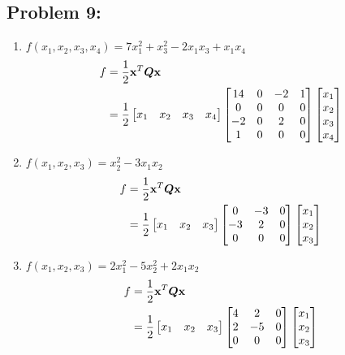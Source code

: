 \documentclass{article}
\begin{document}
\hypertarget{}{}
\subsection*{{Problem 9: }}
\label{}
\begin{enumerate}
\item 
$f(x_1, x_2,x_3, x_4) = 7x_1^2+x_3^2-2x_1x_3+x_1x_4$ \\
\begin{align*} 
f &=\frac{1}{2}\boldsymbol{\mathrm{x}}^T\boldsymbol{Q}\boldsymbol{\mathrm{x}} \\
& =\frac{1}{2} \begin{bmatrix} x_1 &  x_2 & x_3 & x_4  \end{bmatrix} \begin{bmatrix}  14 & 0 & -2 & 1 \\ 0 & 0 & 0 & 0 \\ -2 & 0 & 2 & 0 \\ 1 & 0 & 0 & 0   \end{bmatrix} \begin{bmatrix} x_1 \\  x_2 \\  x_3 \\ x_4 \end{bmatrix}
\end{align*}
\item 
$f(x_1, x_2,x_3) = x_2^2-3x_1x_2$\\
\begin{align*} 
f &=\frac{1}{2}\boldsymbol{\mathrm{x}}^T\boldsymbol{Q}\boldsymbol{\mathrm{x}} \\
& =\frac{1}{2} \begin{bmatrix} x_1 &  x_2 & x_3  \end{bmatrix} \begin{bmatrix}  0 & -3 & 0 \\ -3 & 2 & 0 \\ 0 & 0 & 0   \end{bmatrix} \begin{bmatrix} x_1 \\  x_2 \\  x_3  \end{bmatrix}
\end{align*}
\item 
$f(x_1, x_2,x_3) = 2x_1^2-5x_2^2 +2x_1x_2 $
\begin{align*} 
f &=\frac{1}{2}\boldsymbol{\mathrm{x}}^T\boldsymbol{Q}\boldsymbol{\mathrm{x}} \\
& =\frac{1}{2} \begin{bmatrix} x_1 &  x_2 & x_3  \end{bmatrix} \begin{bmatrix}  4 & 2 & 0 \\ 2 & -5 & 0 \\ 0 & 0 & 0   \end{bmatrix} \begin{bmatrix} x_1 \\  x_2 \\  x_3  \end{bmatrix}
\end{align*}
\end{enumerate}
\end{document}
